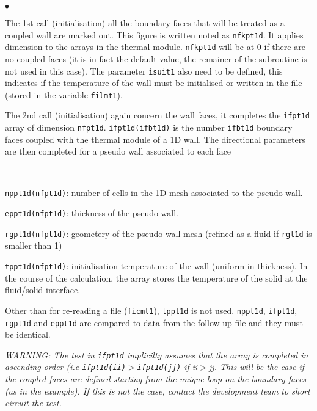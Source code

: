 {{{\begin{list}{$\bullet$}{}
\item The 1st call (initialisation) all the boundary faces that will be treated
 as a coupled wall are marked out. This figure is written noted as
 \texttt{nfkpt1d}. It applies dimension to the arrays in the thermal module.
 \texttt{nfkpt1d} will be at 0 if there are no coupled faces (it is in fact the
 default value, the remainer of the subroutine is not used in this case).
 The parameter \texttt{isuit1} also need to be defined, this indicates if the
 temperature of the wall must be initialised or written in the file (stored in
 the variable \texttt{filmt1}).
\item The 2nd call (initialisation) again concern the wall faces, it completes
 the \texttt{ifpt1d} array of dimension \texttt{nfpt1d}.
 \mbox{\texttt{ifpt1d(ifbt1d)}} is the number
 \texttt{ifbt1d}\raisebox{1ex}{\small th} boundary faces coupled with the thermal module
 of a 1D wall. The directional parameters are then completed for a pseudo
 wall associated to each face
\begin{list}{-}{}
\item \texttt{nppt1d(nfpt1d)}: number of cells in the 1D mesh associated
 to the pseudo wall.
\item \texttt{eppt1d(nfpt1d)}: thickness of the pseudo wall.
\item \texttt{rgpt1d(nfpt1d)}: geometery of the pseudo wall mesh (refined
 as a fluid if \texttt{rgt1d} is smaller than 1)
\item \texttt{tppt1d(nfpt1d)}: initialisation temperature of the wall
(uniform in thickness). In the course of the calculation, the array stores the
 temperature of the solid at the fluid/solid interface.
\end{list}

Other than for re-reading a file (\texttt{ficmt1}), \texttt{tppt1d} is not used.
\texttt{nppt1d}, \texttt{ifpt1d}, \texttt{rgpt1d} and \texttt{eppt1d} are
compared to data from the follow-up file and they must be identical.

{\em WARNING: The test in \texttt{ifpt1d} implicilty assumes that the array is completed
 in ascending order (i.e \texttt{ifpt1d(ii)}$>$\texttt{ifpt1d(jj)} if ii$>$jj.
 This will be the case if the coupled faces are defined starting from the unique loop on the
boundary faces (as in the example). If this is not the case, contact the development
 team to short circuit the test.}


\end{list}}}}
